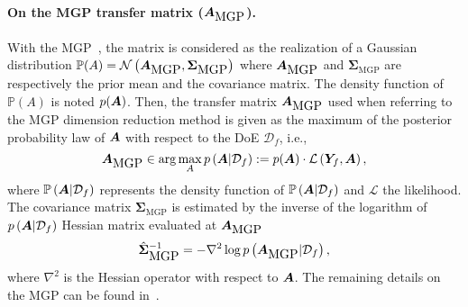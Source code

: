 {\paragraph{On the MGP transfer matrix ($\bm{A}_{\mbox{MGP}}$).}
With the MGP~\cite{GarnettActiveLearningLinear2014}, the matrix is considered as the realization of a Gaussian distribution \mbox{$\mathbb{P}(A) = \mathcal{N}\left(\bm{A}_{\mbox{MGP}}, \bm{\Sigma}_{\mbox{MGP}} \right)$} where $\bm{A}_{\mbox{MGP}}$ and $\bm{\Sigma}_{\mbox{MGP}}$ are respectively the prior mean and the covariance matrix.
The density function of $\mathbb{P}(A)$ is noted $p(\bm{A})$.  Then, the transfer matrix $\bm{A}_{\mbox{MGP}}$ used when referring to the MGP dimension reduction method is given as the maximum of the  posterior probability law of $\bm{A}$ with respect to the DoE $\mathcal{D}_f$, i.e.,
$$
\bm{A}_{\mbox{MGP}} \in \arg \max_{A}  p\left(\bm{A} | \mathcal{D}_f\right):= p(\bm{A}) \cdot \mathcal{L}\left(\bm{Y}_f,\bm{A}\right),
$$
 where  $\mathbb{P}\left(\bm{A} | \mathcal{D}_f\right)$ represents the density function of $\mathbb{P}\left(\bm{A} | \mathcal{D}_f\right)$ and $\mathcal{L}$ the likelihood. The covariance matrix $\bm{\Sigma}_{\mbox{MGP}}$ is estimated by the inverse of the logarithm of $p\left(\bm{A} | \mathcal{D}_f\right)$ Hessian  matrix evaluated at $\bm{A}_{\mbox{MGP}}$
\begin{equation*}
            \hat{\bm{\Sigma}}^{-1}_{\mbox{MGP}}  = - \nabla^2 \log p\left(\bm{A}_{\mbox{MGP}} | \mathcal{D}_f\right),
\end{equation*}
where $\nabla^2$ is the Hessian operator with respect to $\bm{A}$. The remaining details on the MGP can be found in~\cite{GarnettActiveLearningLinear2014}.
}
